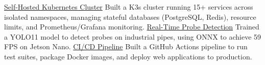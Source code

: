 
\begin{cvprojects}
  \cvproject
    {\href{https://github.com/MarcoDiFrancesco/kubernetes}{Self-Hosted Kubernetes Cluster}}
    {Built a K3s cluster running 15+ services across isolated namespaces, managing stateful databases (PostgreSQL, Redis), resource limits, and Prometheus/Grafana monitoring.}
    {}
    {}
  \cvproject
    {\href{https://github.com/MarcoDiFrancesco/probe-detection}{Real-Time Probe Detection}}
    {Trained a YOLO11 model to detect probes on industrial pipes, using ONNX to achieve 59 FPS on Jetson Nano.}
    {}
    {}
  \cvproject
    {\href{https://marcodifrancesco.com/CalendarAnalyzer/}{CI/CD Pipeline}}
    {Built a GitHub Actions pipeline to run test suites, package Docker images, and deploy web applications to production.}
    {}
    {}
\end{cvprojects}
